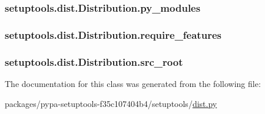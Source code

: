 \subsubsection[{py\+\_\+modules}]{\setlength{\rightskip}{0pt plus 5cm}setuptools.\+dist.\+Distribution.\+py\+\_\+modules}\label{classsetuptools_1_1dist_1_1Distribution_ac9c456efcd8abfa94a30b3d72ae14da3}
\hypertarget{classsetuptools_1_1dist_1_1Distribution_a576913400e1384fe7e79aad89d364ea1}{}
\subsubsection[{require\+\_\+features}]{\setlength{\rightskip}{0pt plus 5cm}setuptools.\+dist.\+Distribution.\+require\+\_\+features}\label{classsetuptools_1_1dist_1_1Distribution_a576913400e1384fe7e79aad89d364ea1}
\hypertarget{classsetuptools_1_1dist_1_1Distribution_a95bf259f63af6e93f852a55ec8350442}{}
\subsubsection[{src\+\_\+root}]{\setlength{\rightskip}{0pt plus 5cm}setuptools.\+dist.\+Distribution.\+src\+\_\+root}\label{classsetuptools_1_1dist_1_1Distribution_a95bf259f63af6e93f852a55ec8350442}


The documentation for this class was generated from the following file\+:\begin{DoxyCompactItemize}
\item 
packages/pypa-\/setuptools-\/f35c107404b4/setuptools/\hyperlink{dist_8py}{dist.\+py}\end{DoxyCompactItemize}
